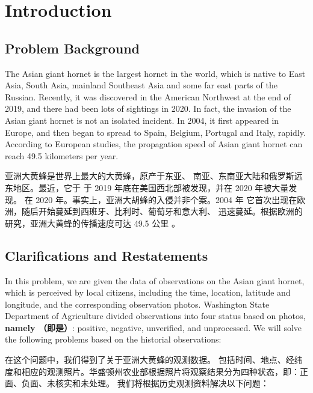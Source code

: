 \documentclass[12pt]{ctexart}
\begin{document}
\section{Introduction}

\subsection{Problem Background}
The Asian giant hornet is the largest hornet in the world, which is native to East Asia,
South Asia, mainland Southeast Asia and some far east parts of the Russian. Recently, it was
discovered in the American Northwest at the end of 2019, and there had been lots of sightings
in 2020. In fact, the invasion of the Asian giant hornet is not an isolated incident. In 2004,
it first appeared in Europe, and then began to spread to Spain, Belgium, Portugal and Italy,
rapidly. According to European studies, the propagation speed of Asian giant hornet can reach
49.5 kilometers per year.

亚洲大黄蜂是世界上最大的大黄蜂，原产于东亚、
南亚、东南亚大陆和俄罗斯远东地区。最近，它于
于 2019 年底在美国西北部被发现，并在 2020 年被大量发现。
在 2020 年。事实上，亚洲大胡蜂的入侵并非个案。2004 年
它首次出现在欧洲，随后开始蔓延到西班牙、比利时、葡萄牙和意大利、
迅速蔓延。根据欧洲的研究，亚洲大黄蜂的传播速度可达
49.5 公里 。

\subsection{Clarifications and Restatements}
In this problem, we are given the data of observations on the Asian giant hornet, which is
perceived by local citizens, including the time, location, latitude and longitude, and the 
corresponding observation photos. Washington State Department of Agriculture divided observations 
into four status based on photos, \textbf{namely （即是）}: positive, negative, unverified, and unprocessed.
We will solve the following problems based on the historial observations:

在这个问题中，我们得到了关于亚洲大黄蜂的观测数据。
包括时间、地点、经纬度和相应的观测照片。华盛顿州农业部根据照片将观察结果分为四种状态，即：正面、负面、未核实和未处理。
我们将根据历史观测资料解决以下问题：
\end{document}
